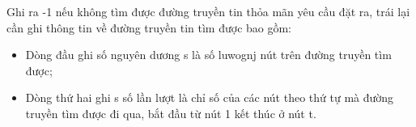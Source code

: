 Ghi ra -1 nếu không tìm được đường truyền tin thỏa mãn yêu cầu đặt ra, trái lại cần ghi thông tin về đường truyền tin tìm được bao gồm:
\begin{itemize}
	\item Dòng đầu ghi số nguyên dương s là số luwognj nút trên đường truyền tìm được;
	\item Dòng thứ hai ghi s số lần lượt là chỉ số của các nút theo thứ tự mà đường truyền tìm được đi qua, bắt đầu từ nút 1 kết thúc ở nút t.
\end{itemize}